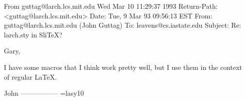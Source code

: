 From guttag@larch.lcs.mit.edu Wed Mar 10 11:29:37 1993
Return-Path: <guttag@larch.lcs.mit.edu>
Date: Tue, 9 Mar 93 09:56:13 EST
From: guttag@larch.lcs.mit.edu (John Guttag)
To: leavens@cs.iastate.edu
Subject: Re:  larch.sty in SliTeX?

Gary,

I have some macros that I think work pretty well, but I use them in
the context of regular LaTeX.

John
-----------------
\font\latexsyms=lasy10

\nosuperscripts
\nosubscripts

\renewcommand{\topfraction}{.95}
\renewcommand{\bottomfraction}{.95}
\renewcommand{\textfraction}{.05}
\renewcommand{\floatpagefraction}{.70}
\setcounter{topnumber}{4}
\setcounter{bottomnumber}{3}
\setcounter{totalnumber}{5}

\newcommand{\f}[1]{{\tt #1}}
\renewcommand{\fbox}[1]{\,\mbox{\f{#1}}\,}
\renewcommand{\d}[1]{{\it #1\/}}
\newcommand{\dbox}[1]{\mbox{\d{#1}}}

\newcommand{\sfig}{\begin{figure}[tbp]}
\newcommand{\efig}[2]{\caption{#1}\label{#2}\end{figure}}


